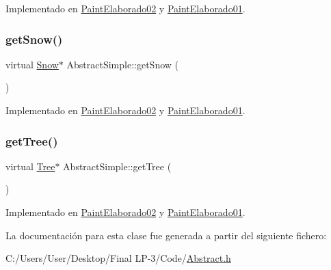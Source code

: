 Implementado en \mbox{\hyperlink{class_paint_elaborado02_a8419fd52c4695f73b0b0ade31450f0ff}{Paint\+Elaborado02}} y \mbox{\hyperlink{class_paint_elaborado01_af3cbb01b8c86f74467c83521548b6311}{Paint\+Elaborado01}}.

\mbox{\label{class_abstract_simple_aad971de50be686f491109651a387ce5e}} 
\subsubsection{\texorpdfstring{getSnow()}{getSnow()}}
{\footnotesize\ttfamily virtual \mbox{\hyperlink{class_snow}{Snow}}$\ast$ Abstract\+Simple\+::get\+Snow (\begin{DoxyParamCaption}{ }\end{DoxyParamCaption})\hspace{0.3cm}{\ttfamily [pure virtual]}}



Implementado en \mbox{\hyperlink{class_paint_elaborado02_ab2e3d866b6b3a650b7cb1ca7186ec3a3}{Paint\+Elaborado02}} y \mbox{\hyperlink{class_paint_elaborado01_a0c42906a02e9f8081521dd7706f63e0f}{Paint\+Elaborado01}}.

\mbox{\label{class_abstract_simple_ad90f5d7d3415a29af8bbf10ad8d89772}} 
\subsubsection{\texorpdfstring{getTree()}{getTree()}}
{\footnotesize\ttfamily virtual \mbox{\hyperlink{class_tree}{Tree}}$\ast$ Abstract\+Simple\+::get\+Tree (\begin{DoxyParamCaption}{ }\end{DoxyParamCaption})\hspace{0.3cm}{\ttfamily [pure virtual]}}



Implementado en \mbox{\hyperlink{class_paint_elaborado02_af943b1fe3a9f276a8780e937150a3ff8}{Paint\+Elaborado02}} y \mbox{\hyperlink{class_paint_elaborado01_a1b6bce9b1cd0bf093eff083e1c2e05f9}{Paint\+Elaborado01}}.



La documentación para esta clase fue generada a partir del siguiente fichero\+:\begin{DoxyCompactItemize}
\item 
C\+:/\+Users/\+User/\+Desktop/\+Final L\+P-\/3/\+Code/\mbox{\hyperlink{_abstract_8h}{Abstract.\+h}}\end{DoxyCompactItemize}
